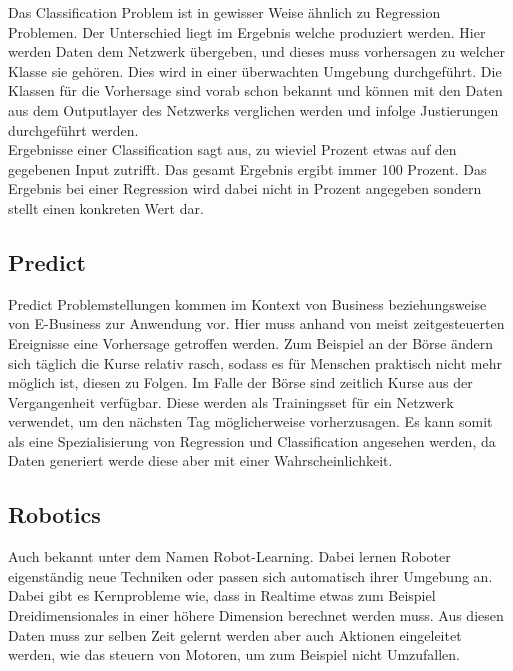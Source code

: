 Das Classification Problem ist in gewisser Weise ähnlich zu Regression Problemen. 
Der Unterschied liegt im Ergebnis welche produziert werden.  
Hier werden Daten dem Netzwerk übergeben, und dieses muss vorhersagen zu welcher Klasse sie gehören. Dies wird in einer überwachten Umgebung durchgeführt. 
Die Klassen für die Vorhersage sind vorab schon bekannt und können mit den Daten aus dem Outputlayer des Netzwerks verglichen werden und infolge Justierungen durchgeführt werden. \cite{AI3} \\

\noindent
Ergebnisse einer Classification sagt aus, zu wieviel Prozent etwas auf den gegebenen Input zutrifft. 
Das gesamt Ergebnis ergibt immer 100 Prozent. 
Das Ergebnis bei einer Regression wird dabei nicht in Prozent angegeben sondern stellt einen konkreten Wert dar.

\subsection{Predict}
\label{subsec:Predict}

Predict Problemstellungen kommen im Kontext von Business beziehungsweise von E-Business zur Anwendung vor. 
Hier muss anhand von meist zeitgesteuerten Ereignisse eine Vorhersage getroffen werden. 
Zum Beispiel an der Börse ändern sich täglich die Kurse relativ rasch, sodass es für Menschen praktisch nicht mehr möglich ist, diesen zu Folgen. 
Im Falle der Börse sind zeitlich Kurse aus der Vergangenheit verfügbar. 
Diese werden als Trainingsset für ein Netzwerk verwendet, um den nächsten Tag möglicherweise vorherzusagen. 
Es kann somit als eine Spezialisierung von Regression und Classification angesehen werden, da Daten generiert werde diese aber mit einer Wahrscheinlichkeit.

\subsection{Robotics}
\label{subsec:Robotics}

Auch bekannt unter dem Namen Robot-Learning. 
Dabei lernen Roboter eigenständig neue Techniken oder passen sich automatisch ihrer Umgebung an. 
Dabei gibt es Kernprobleme wie, dass in Realtime etwas zum Beispiel Dreidimensionales in einer höhere Dimension berechnet werden muss.
Aus diesen Daten muss zur selben Zeit gelernt werden aber auch Aktionen eingeleitet werden, wie das steuern von Motoren, um zum Beispiel nicht Umzufallen.

